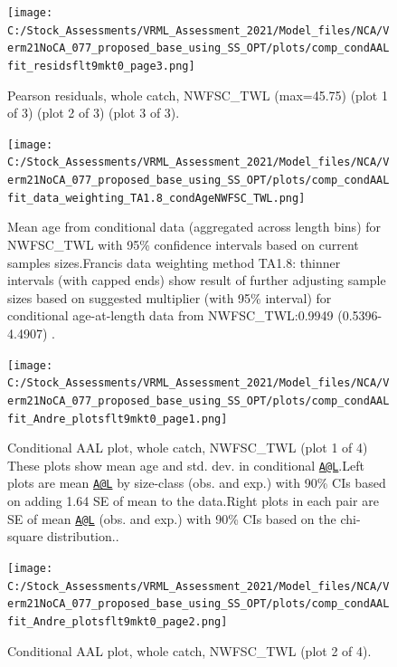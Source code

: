 \documentclass[
  english,
  a4paper,
]{article}
\begin{document}
\begin{figure}
\centering
\texttt{[image: C:/Stock\_Assessments/VRML\_Assessment\_2021/Model\_files/NCA/Verm21NoCA\_077\_proposed\_base\_using\_SS\_OPT/plots/comp\_condAALfit\_residsflt9mkt0\_page3.png]}
\caption{Pearson residuals, whole catch, NWFSC\_TWL (max=45.75) (plot 1 of 3) (plot 2 of 3) (plot 3 of 3).\label{fig:comp_condAALfit_residsflt9mkt0_page3}}
\end{figure}

\begin{figure}
\centering
\texttt{[image: C:/Stock\_Assessments/VRML\_Assessment\_2021/Model\_files/NCA/Verm21NoCA\_077\_proposed\_base\_using\_SS\_OPT/plots/comp\_condAALfit\_data\_weighting\_TA1.8\_condAgeNWFSC\_TWL.png]}
\caption{Mean age from conditional data (aggregated across length bins) for NWFSC\_TWL with 95\% confidence intervals based on current samples sizes.Francis data weighting method TA1.8: thinner intervals (with capped ends) show result of further adjusting sample sizes based on suggested multiplier (with 95\% interval) for conditional age-at-length data from NWFSC\_TWL:0.9949 (0.5396-4.4907) .\label{fig:comp_condAALfit_data_weighting_TA1.8_condAgeNWFSC_TWL}}
\end{figure}

\begin{figure}
\centering
\texttt{[image: C:/Stock\_Assessments/VRML\_Assessment\_2021/Model\_files/NCA/Verm21NoCA\_077\_proposed\_base\_using\_SS\_OPT/plots/comp\_condAALfit\_Andre\_plotsflt9mkt0\_page1.png]}
\caption{Conditional AAL plot, whole catch, NWFSC\_TWL (plot 1 of 4)
These plots show mean age and std. dev. in conditional \href{mailto:A@L}{\nolinkurl{A@L}}.Left plots are mean \href{mailto:A@L}{\nolinkurl{A@L}} by size-class (obs. and exp.) with 90\% CIs based on adding 1.64 SE of mean to the data.Right plots in each pair are SE of mean \href{mailto:A@L}{\nolinkurl{A@L}} (obs. and exp.) with 90\% CIs based on the chi-square distribution..\label{fig:comp_condAALfit_Andre_plotsflt9mkt0_page1}}
\end{figure}

\begin{figure}
\centering
\texttt{[image: C:/Stock\_Assessments/VRML\_Assessment\_2021/Model\_files/NCA/Verm21NoCA\_077\_proposed\_base\_using\_SS\_OPT/plots/comp\_condAALfit\_Andre\_plotsflt9mkt0\_page2.png]}
\caption{Conditional AAL plot, whole catch, NWFSC\_TWL (plot 2 of 4).\label{fig:comp_condAALfit_Andre_plotsflt9mkt0_page2}}
\end{figure}
\end{document}

